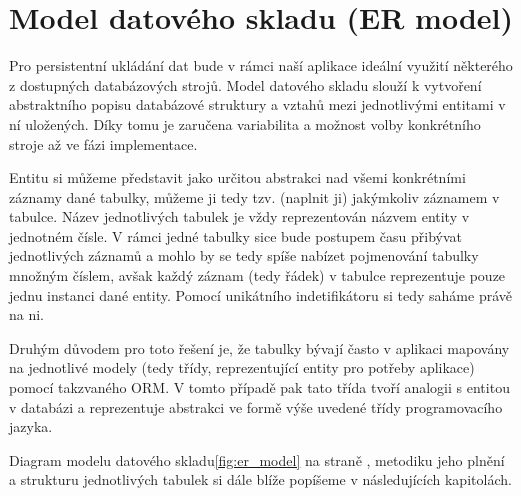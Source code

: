\documentclass[thesis=M,czech]{FITthesis}[2012/06/26]
\begin{document}
\section{Model datového skladu (ER model)}\label{sec:er_model}
Pro persistentní ukládání dat bude v rámci naší aplikace ideální využití některého z dostupných databázových strojů. Model datového skladu slouží k vytvoření abstraktního popisu databázové struktury a vztahů mezi jednotlivými entitami v ní uložených. Díky tomu je zaručena variabilita a možnost volby konkrétního stroje až ve fázi implementace.

Entitu si můžeme představit jako určitou abstrakci nad všemi konkrétními záznamy dané tabulky, můžeme ji tedy tzv.  (naplnit ji) jakýmkoliv záznamem v tabulce. Název jednotlivých tabulek je vždy reprezentován názvem entity v jednotném čísle. V rámci jedné tabulky sice bude postupem času přibývat jednotlivých záznamů a mohlo by se tedy spíše nabízet pojmenování tabulky množným číslem, avšak každý záznam (tedy řádek) v tabulce reprezentuje pouze jednu instanci dané entity. Pomocí unikátního indetifikátoru si tedy saháme právě na ni.

Druhým důvodem pro toto řešení je, že tabulky bývají často v aplikaci mapovány na jednotlivé modely (tedy třídy, reprezentující entity pro potřeby aplikace) pomocí takzvaného ORM. V tomto případě pak tato třída tvoří analogii s entitou v databázi a reprezentuje abstrakci ve formě výše uvedené třídy programovacího jazyka.

Diagram modelu datového skladu\ref{fig:er_model} na straně \pageref{fig:er_model}, metodiku jeho plnění a strukturu jednotlivých tabulek si dále blíže popíšeme v následujících kapitolách.
\end{document}
